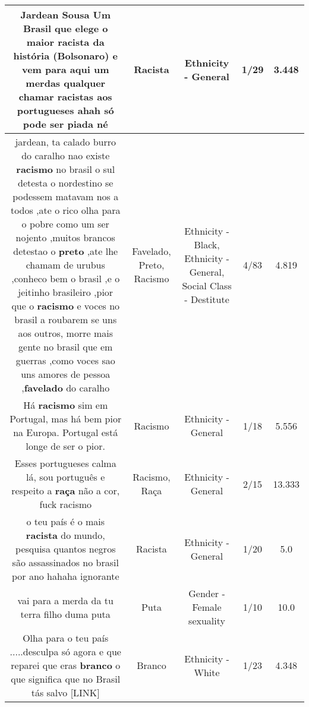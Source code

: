 \documentclass[11pt]{article}
\newlength\mylength
\begin{document}
\begin{center}
\begin{longtable}{|C{.65\mylength}|C{.30\mylength}|C{.12\mylength}|C{.12\mylength}|C{.12\mylength}|}
  \small Jardean Sousa  Um  Brasil que elege  o  maior \textbf{racista} da história (Bolsonaro) e vem para aqui um merdas qualquer chamar racistas aos portugueses ahah só pode ser piada né\normalsize   & Racista & Ethnicity - General & 1/29 & 3.448 \\  \hline
  \small jardean, ta calado burro do caralho nao existe \textbf{racismo} no brasil o sul detesta o nordestino se podessem matavam nos a todos ,ate o rico olha para o pobre como um ser nojento ,muitos brancos detestao o \textbf{preto} ,ate lhe chamam  de urubus ,conheco bem o brasil ,e o jeitinho brasileiro ,pior que o \textbf{racismo} e voces no brasil a roubarem se uns aos outros, morre mais gente no brasil que em guerras ,como voces sao uns amores de pessoa ,\textbf{favelado} do caralho\normalsize   & Favelado, Preto, Racismo & Ethnicity - Black, Ethnicity - General, Social Class - Destitute & 4/83 & 4.819 \\  \hline
  \small Há \textbf{racismo} sim em Portugal, mas há bem pior na Europa. Portugal está longe de ser o pior.\normalsize   & Racismo & Ethnicity - General & 1/18 & 5.556 \\  \hline
  \small Esses portugueses calma lá, sou português e respeito a \textbf{raça} não a cor, fuck racismo\normalsize   & Racismo, Raça & Ethnicity - General & 2/15 & 13.333 \\  \hline
  \small o teu país é o mais \textbf{racista} do mundo, pesquisa quantos negros são assassinados no brasil por ano hahaha ignorante\normalsize   & Racista & Ethnicity - General & 1/20 & 5.0 \\  \hline
  \small vai para a merda da  tu terra filho duma puta\normalsize   & Puta & Gender - Female sexuality & 1/10 & 10.0 \\  \hline
  \small Olha para o teu país .....desculpa só agora e que reparei que eras \textbf{branco} o que significa que no Brasil tás salvo  [LINK] \normalsize   & Branco & Ethnicity - White & 1/23 & 4.348 \\  \hline

\end{longtable}
\end{center}
\end{document}
